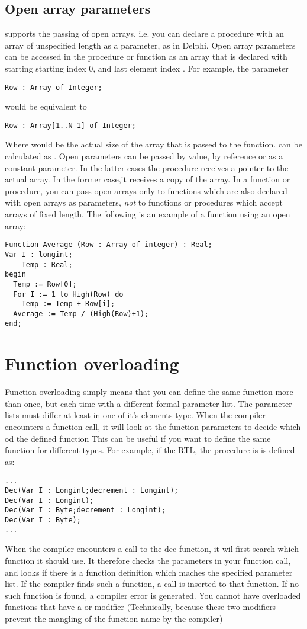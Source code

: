 \documentclass{report}
\begin{document}
\subsection{Open array parameters}
\label{se:openarray}
\fpc supports the passing of open arrays, i.e. you can declare a procedure
with an array of unspecified length as a parameter, as in Delphi.
Open array parameters can be accessed in the procedure or function as an
array that is declared with starting starting index 0, and last element
index .
For example, the parameter
\begin{verbatim}
Row : Array of Integer;
\end{verbatim}
would be equivalent to
\begin{verbatim}
Row : Array[1..N-1] of Integer;
\end{verbatim}
Where   would be the actual size of the array that is passed to the
function.  can be calculated as .
Open parameters can be passed by value, by reference or as a constant
parameter. In the latter cases the procedure receives a pointer to the
actual array. In the former case,it receives a copy of the array.
In a function or procedure, you can pass open arrays only to functions which
are also declared with open arrays as parameters, {\em not} to functions or
procedures which accept arrays of fixed length.
The following is an example of a function using an open array:
\begin{verbatim}
Function Average (Row : Array of integer) : Real;
Var I : longint;
    Temp : Real;
begin
  Temp := Row[0];
  For I := 1 to High(Row) do
    Temp := Temp + Row[i];
  Average := Temp / (High(Row)+1);
end;
\end{verbatim}
\section{Function overloading}
Function overloading simply means that you can define the same function more
than once, but each time with a different formal parameter list.
The parameter lists must differ at least in one of it's elements type.
When the compiler encounters a function call, it will look at the function
parameters to decide which od the defined function
This can be useful if you want to define the same function for different
types. For example, if the RTL, the   procedure is
is defined as:
\begin{verbatim}
...
Dec(Var I : Longint;decrement : Longint);
Dec(Var I : Longint);
Dec(Var I : Byte;decrement : Longint);
Dec(Var I : Byte);
...
\end{verbatim}
When the compiler encounters a call to the dec function, it wil first search
which function it should use. It therefore checks the parameters in your
function call, and looks if there is a function definition which maches the
specified parameter list. If the compiler finds such a function, a call is
inserted to that function. If no such function is found, a compiler error is
generated.
You cannot have overloaded functions that have a  or 
modifier (Technically, because these two modifiers prevent the mangling of
the function name by the compiler)
\end{document}
